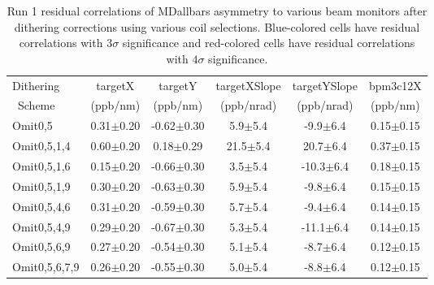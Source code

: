 \begin{table}[!h]
\caption{Run 1 residual correlations of MDallbars asymmetry to various beam monitors after dithering corrections using various coil selections. Blue-colored cells have residual correlations with $3\sigma$ significance and  red-colored cells have residual correlations with $4\sigma$ significance.}
\begin{center}
\begin{tabular}[h]{|l|c|c|c|c|c|}\hline
Dithering&targetX&targetY&targetXSlope&targetYSlope&bpm3c12X\\
~Scheme&(ppb/nm)&(ppb/nm)&(ppb/nrad)&(ppb/nrad)&(ppb/nm)\\\hline
Omit0,5& 0.31$\pm$0.20& -0.62$\pm$0.30& 5.9$\pm$5.4& -9.9$\pm$6.4& 0.15$\pm$0.15\\\hline
Omit0,5,1,4&\color{blue} 0.60$\pm$0.20& 0.18$\pm$0.29& \color{red}21.5$\pm$5.4&\color{blue} 20.7$\pm$6.4& 0.37$\pm$0.15\\\hline
Omit0,5,1,6& 0.15$\pm$0.20& -0.66$\pm$0.30& 3.5$\pm$5.4& -10.3$\pm$6.4& 0.18$\pm$0.15\\\hline
Omit0,5,1,9& 0.30$\pm$0.20& -0.63$\pm$0.30& 5.9$\pm$5.4& -9.8$\pm$6.4& 0.15$\pm$0.15\\\hline
Omit0,5,4,6& 0.31$\pm$0.20& -0.59$\pm$0.30& 5.7$\pm$5.4& -9.4$\pm$6.4& 0.14$\pm$0.15\\\hline
Omit0,5,4,9& 0.29$\pm$0.20& -0.67$\pm$0.30& 5.3$\pm$5.4& -11.1$\pm$6.4& 0.14$\pm$0.15\\\hline
Omit0,5,6,9& 0.27$\pm$0.20& -0.54$\pm$0.30& 5.1$\pm$5.4& -8.7$\pm$6.4& 0.12$\pm$0.15\\\hline
Omit0,5,6,7,9& 0.26$\pm$0.20& -0.55$\pm$0.30& 5.0$\pm$5.4& -8.8$\pm$6.4& 0.12$\pm$0.15\\\hline
\end{tabular}
\end{center}
\label{tab:run1_om05_residual_correlations_table}
\end{table}
